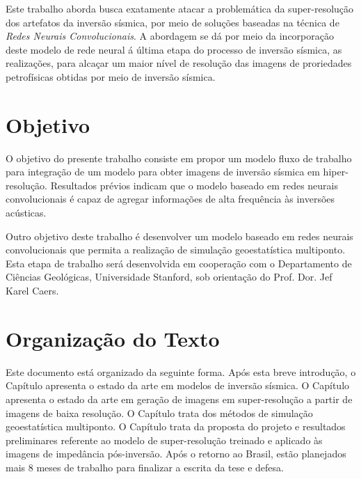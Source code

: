 Este trabalho aborda busca exatamente atacar a problemática da super-resolução dos artefatos da inversão sísmica,
por meio de soluções baseadas na técnica de \textit{Redes Neurais Convolucionais}.
A abordagem se dá por meio da incorporação deste modelo de rede neural á última
etapa do processo de inversão sísmica, as realizações, para alcaçar um maior nível de
resolução das imagens de proriedades petrofísicas obtidas por meio de inversão sísmica.

\section{Objetivo}

O objetivo do presente trabalho consiste em propor um modelo fluxo de trabalho
para integração de um modelo para obter imagens de inversão sísmica em hiper-resolução.
Resultados prévios indicam que o modelo baseado em redes neurais convolucionais é capaz
de agregar informações de alta frequência às inversões acústicas.

Outro objetivo deste trabalho é desenvolver um modelo baseado em redes neurais convolucionais que permita a
realização de simulação geoestatística multiponto. Esta etapa de trabalho será desenvolvida
em cooperação com o Departamento de Ciências Geológicas, Universidade Stanford, sob
orientação do Prof. Dor. Jef Karel Caers.


\section{Organização do Texto}

Este documento está organizado da seguinte forma. Após esta breve introdução, o
Capítulo %
apresenta o estado da arte em modelos de
inversão sísmica. O Capítulo %
apresenta o estado da arte 
em geração de imagens em super-resolução a partir de imagens de baixa resolução.
O Capítulo trata dos métodos de simulação geoestatística multiponto. O
Capítulo %
trata da proposta do projeto e resultados
preliminares referente ao modelo de super-resolução treinado e aplicado às imagens
de impedância pós-inversão. Após o retorno ao Brasil, estão planejados mais 8 meses
de trabalho para finalizar a escrita da tese e defesa.

